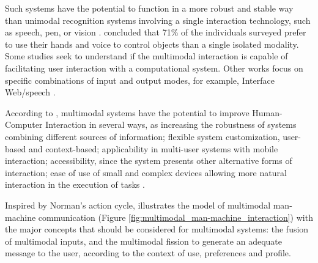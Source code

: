 Such systems have the potential to function in a more robust and stable way than unimodal recognition systems involving a single interaction technology, such as speech, pen, or vision \cite{Oviatt2003}.  concluded that 71\% of the individuals surveyed prefer to use their hands and voice to control objects than a single isolated modality. Some studies seek to understand if the multimodal interaction is capable of facilitating user interaction with a computational system. Other works focus on specific combinations of input and output modes, for example, Interface Web/speech \cite{Neto2008}.

According to , multimodal systems have the potential to improve Human-Computer Interaction in several ways, as increasing the robustness of systems combining different sources of information; flexible system customization, user-based and context-based; applicability in multi-user systems with mobile interaction; accessibility, since the system presents other alternative forms of interaction; ease of use of small and complex devices allowing more natural interaction in the execution of tasks \cite{InacioJunior2007}.

Inspired by Norman’s action cycle,  illustrates the model of multimodal man-machine communication (Figure \ref{fig:multimodal_man-machine_interaction}) with the major concepts that should be considered for multimodal systems: the fusion of multimodal inputs, and the multimodal fission to generate an adequate message to the user, according to the context of use, preferences and profile.

 	\begin{figure}[h] 
   	    \captionsetup{width=16cm}%
	\end{figure}

